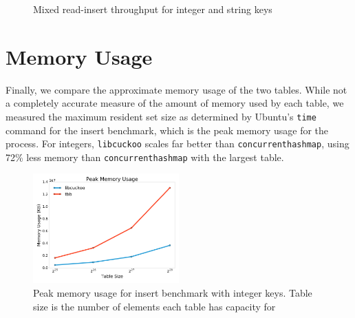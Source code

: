 \documentclass{article}
\newcommand{\tbbmap}{\texttt{concurrent\textunderscore hash\textunderscore map}}
\newcommand{\libcuckoo}{\texttt{libcuckoo}}
\begin{document}
\begin{figure}[!htbp]
  \centering
  \caption{Mixed read-insert throughput for integer and string keys}
  \label{fig:mixed-read-insert}
\end{figure}

\section*{Memory Usage}
Finally, we compare the approximate memory usage of the two tables. While not a
completely accurate measure of the amount of memory used by each table, we
measured the maximum resident set size as determined by Ubuntu's \texttt{time}
command for the insert benchmark, which is the peak memory usage for the
process. For integers, {\libcuckoo} scales far better than {\tbbmap}, using 72\%
less memory than {\tbbmap} with the largest table.

\begin{figure}[!htbp]
  \centering
  \includegraphics[width=0.5\textwidth]{mem}
  \caption{Peak memory usage for insert benchmark with integer keys. Table size
    is the number of elements each table has capacity for}
  \label{fig:mem}
\end{figure}
\end{document}
